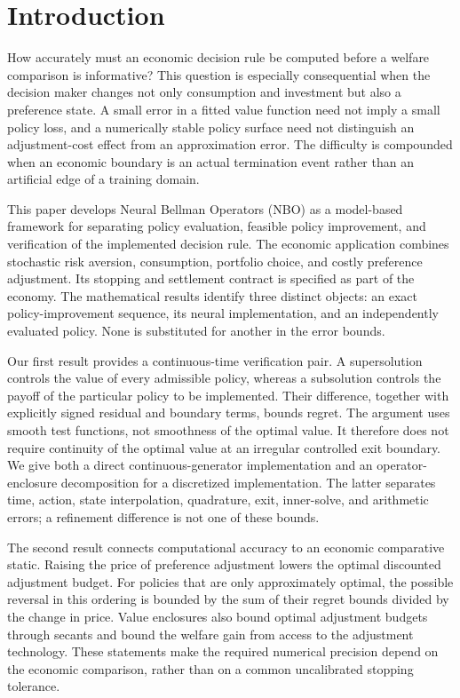 \section{Introduction}
How accurately must an economic decision rule be computed before a welfare comparison is informative? This question is especially consequential when the decision maker changes not only consumption and investment but also a preference state. A small error in a fitted value function need not imply a small policy loss, and a numerically stable policy surface need not distinguish an adjustment-cost effect from an approximation error. The difficulty is compounded when an economic boundary is an actual termination event rather than an artificial edge of a training domain.

This paper develops Neural Bellman Operators (NBO) as a model-based framework for separating policy evaluation, feasible policy improvement, and verification of the implemented decision rule. The economic application combines stochastic risk aversion, consumption, portfolio choice, and costly preference adjustment. Its stopping and settlement contract is specified as part of the economy. The mathematical results identify three distinct objects: an exact policy-improvement sequence, its neural implementation, and an independently evaluated policy. None is substituted for another in the error bounds.

Our first result provides a continuous-time verification pair. A supersolution controls the value of every admissible policy, whereas a subsolution controls the payoff of the particular policy to be implemented. Their difference, together with explicitly signed residual and boundary terms, bounds regret. The argument uses smooth test functions, not smoothness of the optimal value. It therefore does not require continuity of the optimal value at an irregular controlled exit boundary. We give both a direct continuous-generator implementation and an operator-enclosure decomposition for a discretized implementation. The latter separates time, action, state interpolation, quadrature, exit, inner-solve, and arithmetic errors; a refinement difference is not one of these bounds.

The second result connects computational accuracy to an economic comparative static. Raising the price of preference adjustment lowers the optimal discounted adjustment budget. For policies that are only approximately optimal, the possible reversal in this ordering is bounded by the sum of their regret bounds divided by the change in price. Value enclosures also bound optimal adjustment budgets through secants and bound the welfare gain from access to the adjustment technology. These statements make the required numerical precision depend on the economic comparison, rather than on a common uncalibrated stopping tolerance.

